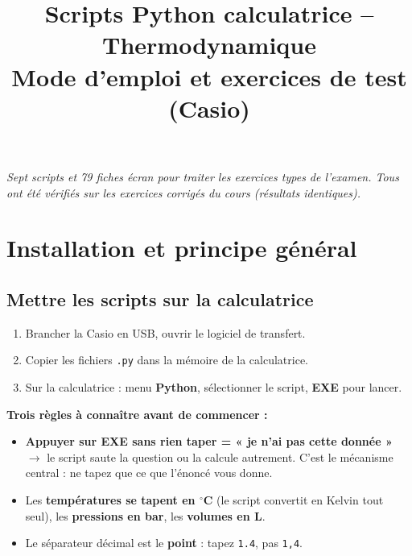 \documentclass[10.5pt,a4paper]{article}
\title{\textbf{Scripts Python calculatrice -- Thermodynamique}\\[3pt]
\large Mode d'emploi et exercices de test (Casio)}
\author{}
\date{}
\begin{document}
\maketitle
\vspace{-0.9cm}
\begin{center}
\small\itshape Sept scripts et 79 fiches écran pour traiter les exercices types de l'examen. Tous ont été vérifiés sur les
exercices corrigés du cours (résultats identiques).
\end{center}
\vspace{0.3cm}

\section{Installation et principe général}

\subsection*{Mettre les scripts sur la calculatrice}
\begin{enumerate}[leftmargin=1.5em]
\item Brancher la Casio en USB, ouvrir le logiciel de transfert.
\item Copier les fichiers \texttt{.py} dans la mémoire de la calculatrice.
\item Sur la calculatrice : menu \textbf{Python}, sélectionner le script, \textbf{EXE} pour lancer.
\end{enumerate}

\begin{piege}
\textbf{Trois règles à connaître avant de commencer :}
\begin{itemize}[leftmargin=1.3em,nosep]
\item \textbf{Appuyer sur EXE sans rien taper = « je n'ai pas cette donnée »} $\rightarrow$ le script
saute la question ou la calcule autrement. C'est le mécanisme central : ne tapez que ce que l'énoncé
vous donne.
\item Les \textbf{températures se tapent en $^\circ$C} (le script convertit en Kelvin tout seul), les
\textbf{pressions en bar}, les \textbf{volumes en L}.
\item Le séparateur décimal est le \textbf{point} : tapez \texttt{1.4}, pas \texttt{1,4}.
\end{itemize}
\end{piege}
\end{document}
